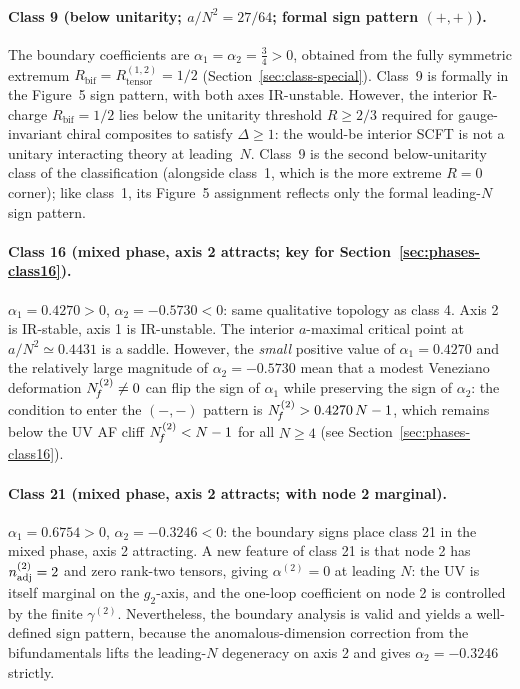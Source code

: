 \paragraph{Class 9 (below unitarity; $a/N^{2}=27/64$; formal sign pattern $(+,+)$).}
The boundary coefficients are
$\alpha_{1}=\alpha_{2}=\tfrac{3}{4}>0$, obtained from the fully
symmetric extremum $R_{\text{bif}}=R_{\text{tensor}}^{(1,2)}=1/2$
(Section~\ref{sec:class-special}).  Class~9 is formally in the
Figure~5 sign pattern, with both axes IR-unstable.  However, the
interior R-charge $R_{\text{bif}}=1/2$ lies below the unitarity
threshold $R\ge 2/3$ required for gauge-invariant chiral composites
to satisfy $\Delta\ge 1$: the would-be interior SCFT is not a unitary
interacting theory at leading~$N$.  Class~9 is the second
below-unitarity class of the classification (alongside class~1, which
is the more extreme $R=0$ corner); like class~1, its Figure~5
assignment reflects only the formal leading-$N$ sign pattern.

\paragraph{Class 16 (mixed phase, axis 2 attracts; key for
Section~\ref{sec:phases-class16}).}
$\alpha_{1}=0.4270>0$, $\alpha_{2}=-0.5730<0$: same qualitative
topology as class 4.  Axis 2 is IR-stable, axis 1 is IR-unstable.
The interior $a$-maximal critical point at $a/N^{2}\simeq 0.4431$ is
a saddle.  However, the \emph{small} positive value of
$\alpha_{1}=0.4270$ and the relatively large magnitude of
$\alpha_{2}=-0.5730$ mean that a modest Veneziano deformation
$N_{\!f}^{(2)}\ne 0$ can flip the sign of $\alpha_{1}$ while preserving
the sign of $\alpha_{2}$: the condition to enter the
$(-,-)$ pattern is $N_{\!f}^{(2)}>0.4270\,N-1$, which remains below the
UV AF cliff $N_{\!f}^{(2)}<N-1$ for all $N\ge 4$ (see
Section~\ref{sec:phases-class16}).

\paragraph{Class 21 (mixed phase, axis 2 attracts; with node 2
marginal).}
$\alpha_{1}=0.6754>0$, $\alpha_{2}=-0.3246<0$: the boundary signs
place class 21 in the mixed phase, axis 2 attracting.  A new feature
of class 21 is that node 2 has $n_{\mathrm{adj}}^{(2)}=2$ and zero
rank-two tensors, giving $\alpha^{(2)}=0$ at leading $N$:
the UV is itself marginal on the $g_{2}$-axis, and the one-loop
coefficient on node 2 is controlled by the finite $\gamma^{(2)}$.
Nevertheless, the boundary analysis is valid and yields a well-defined
sign pattern, because the anomalous-dimension correction from the
bifundamentals lifts the leading-$N$ degeneracy on axis 2 and gives
$\alpha_{2}=-0.3246$ strictly.

